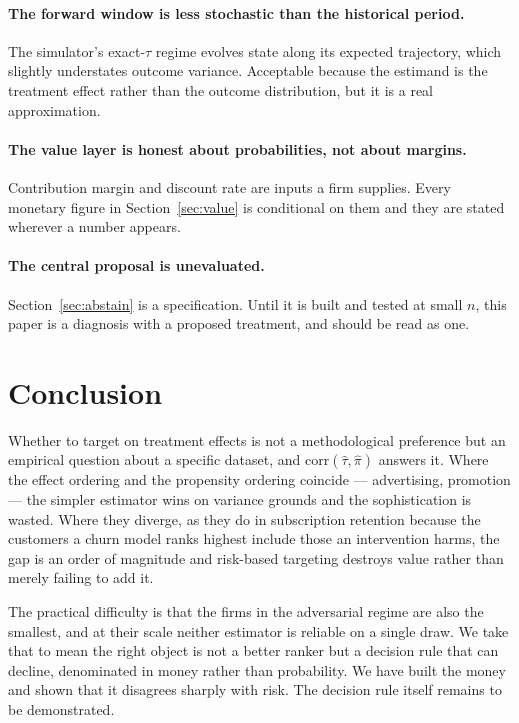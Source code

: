 \documentclass[11pt,a4paper]{article}
\newcommand{\corr}{\mathrm{corr}}
\newcommand{\CATE}{\tau}
\begin{document}
\paragraph{The forward window is less stochastic than the historical period.} The
simulator's exact-$\CATE$ regime evolves state along its expected trajectory, which
slightly understates outcome variance. Acceptable because the estimand is the
treatment effect rather than the outcome distribution, but it is a real
approximation.

\paragraph{The value layer is honest about probabilities, not about margins.}
Contribution margin and discount rate are inputs a firm supplies. Every monetary
figure in Section~\ref{sec:value} is conditional on them and they are stated
wherever a number appears.

\paragraph{The central proposal is unevaluated.} Section~\ref{sec:abstain} is a
specification. Until it is built and tested at small $n$, this paper is a diagnosis
with a proposed treatment, and should be read as one.

\section{Conclusion}

Whether to target on treatment effects is not a methodological preference but an
empirical question about a specific dataset, and $\corr(\hat\CATE, \hat\pi)$ answers
it. Where the effect ordering and the propensity ordering coincide --- advertising,
promotion --- the simpler estimator wins on variance grounds and the sophistication
is wasted. Where they diverge, as they do in subscription retention because the
customers a churn model ranks highest include those an intervention harms, the gap
is an order of magnitude and risk-based targeting destroys value rather than merely
failing to add it.

The practical difficulty is that the firms in the adversarial regime are also the
smallest, and at their scale neither estimator is reliable on a single draw. We take
that to mean the right object is not a better ranker but a decision rule that can
decline, denominated in money rather than probability. We have built the money and
shown that it disagrees sharply with risk. The decision rule itself remains to be
demonstrated.
\end{document}
